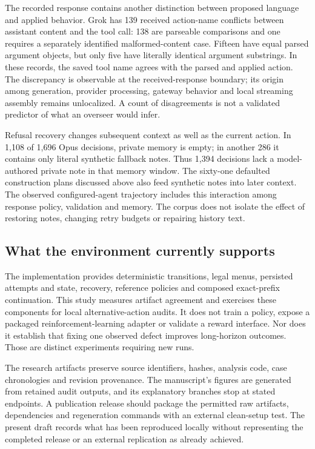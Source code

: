 The recorded response contains another distinction between proposed language and applied behavior. Grok has 139 received action-name conflicts between assistant content and the tool call: 138 are parseable comparisons and one requires a separately identified malformed-content case. Fifteen have equal parsed argument objects, but only five have literally identical argument substrings. In these records, the saved tool name agrees with the parsed and applied action. The discrepancy is observable at the received-response boundary; its origin among generation, provider processing, gateway behavior and local streaming assembly remains unlocalized. A count of disagreements is not a validated predictor of what an overseer would infer.

Refusal recovery changes subsequent context as well as the current action. In 1,108 of 1,696 Opus decisions, private memory is empty; in another 286 it contains only literal synthetic fallback notes. Thus 1,394 decisions lack a model-authored private note in that memory window. The sixty-one defaulted construction plans discussed above also feed synthetic notes into later context. The observed configured-agent trajectory includes this interaction among response policy, validation and memory. The corpus does not isolate the effect of restoring notes, changing retry budgets or repairing history text.

\subsection{What the environment currently supports}

The implementation provides deterministic transitions, legal menus, persisted attempts and state, recovery, reference policies and composed exact-prefix continuation. This study measures artifact agreement and exercises these components for local alternative-action audits. It does not train a policy, expose a packaged reinforcement-learning adapter or validate a reward interface. Nor does it establish that fixing one observed defect improves long-horizon outcomes. Those are distinct experiments requiring new runs.

The research artifacts preserve source identifiers, hashes, analysis code, case chronologies and revision provenance. The manuscript's figures are generated from retained audit outputs, and its explanatory branches stop at stated endpoints. A publication release should package the permitted raw artifacts, dependencies and regeneration commands with an external clean-setup test. The present draft records what has been reproduced locally without representing the completed release or an external replication as already achieved.

